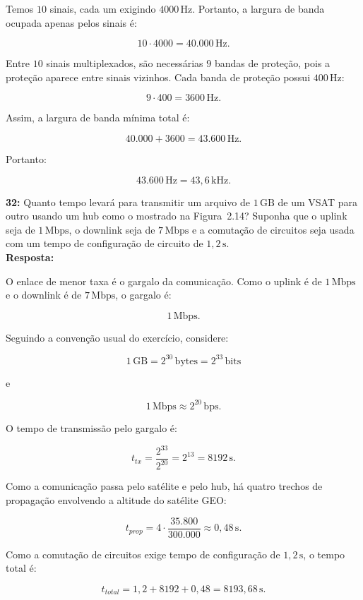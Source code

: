 \documentclass[12pt,a4paper]{report}
\begin{document}
Temos $10$ sinais, cada um exigindo $4000\,\text{Hz}$. Portanto, a largura de banda ocupada apenas pelos sinais é:

\[
10 \cdot 4000 = 40.000\,\text{Hz}.
\]

Entre $10$ sinais multiplexados, são necessárias $9$ bandas de proteção, pois a proteção aparece entre sinais vizinhos. Cada banda de proteção possui $400\,\text{Hz}$:

\[
9 \cdot 400 = 3600\,\text{Hz}.
\]

Assim, a largura de banda mínima total é:

\[
40.000 + 3600 = 43.600\,\text{Hz}.
\]

Portanto:

\[
\boxed{43.600\,\text{Hz} = 43{,}6\,\text{kHz}}.
\]


\vspace{0.6cm}

\noindent \textbf{32:} Quanto tempo levará para transmitir um arquivo de $1\,\text{GB}$ de um VSAT para outro usando um hub como o mostrado na Figura~2.14? Suponha que o uplink seja de $1\,\text{Mbps}$, o downlink seja de $7\,\text{Mbps}$ e a comutação de circuitos seja usada com um tempo de configuração de circuito de $1{,}2\,\text{s}$.\\
\textbf{Resposta:}

O enlace de menor taxa é o gargalo da comunicação. Como o uplink é de $1\,\text{Mbps}$ e o downlink é de $7\,\text{Mbps}$, o gargalo é:

\[
1\,\text{Mbps}.
\]

Seguindo a convenção usual do exercício, considere:

\[
1\,\text{GB} = 2^{30}\,\text{bytes} = 2^{33}\,\text{bits}
\]

e

\[
1\,\text{Mbps} \approx 2^{20}\,\text{bps}.
\]

O tempo de transmissão pelo gargalo é:

\[
t_{tx} = \frac{2^{33}}{2^{20}} = 2^{13} = 8192\,\text{s}.
\]

Como a comunicação passa pelo satélite e pelo hub, há quatro trechos de propagação envolvendo a altitude do satélite GEO:

\[
t_{prop} = 4 \cdot \frac{35.800}{300.000} \approx 0{,}48\,\text{s}.
\]

Como a comutação de circuitos exige tempo de configuração de $1{,}2\,\text{s}$, o tempo total é:

\[
t_{total} = 1{,}2 + 8192 + 0{,}48 = 8193{,}68\,\text{s}.
\]
\end{document}
